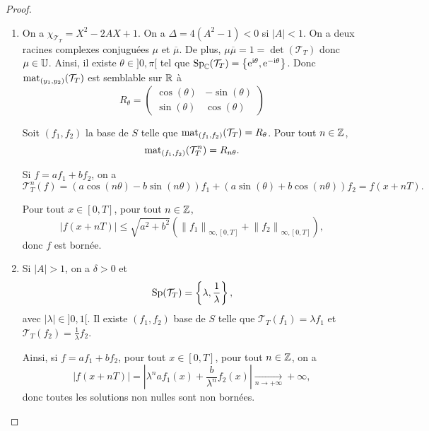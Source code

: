 \documentclass[12pt]{article}
\begin{document}
\begin{proof}
\begin{enumerate}
		\item On a $\chi_{\mathcal{T}_T}=X^{2}-2AX+1$. On a $\Delta=4(A^{2}-1)<0$ si $\left\lvert A\right\rvert<1$. On a deux racines complexes conjuguées $\mu$ et $\overline{\mu}$. De plus, $\mu\overline{\mu}=1=\det(\mathcal{T}_T)$ donc $\mu\in\mathbb{U}$. Ainsi, il existe $\theta\in]0,\pi[$ tel que $\operatorname{Sp}_{\mathbb{C}}(\mathcal{T}_T)=\left\lbrace\mathrm{e}^{\mathrm{i}\theta},\mathrm{e}^{-\mathrm{i}\theta}\right\rbrace$. Donc $\operatorname{mat}_{(y_1,y_2)}(\mathcal{T}_T)$ est semblable sur $\mathbb{R}$ à
		\begin{equation}
			R_{\theta}=\begin{pmatrix}
				\cos(\theta) & -\sin(\theta)\\
				\sin(\theta) & \cos(\theta)
			\end{pmatrix}
		\end{equation}

		Soit $(f_1,f_2)$ la base de $S$ telle que $\operatorname{mat}_{(f_1,f_2)}(\mathcal{T}_{T})=R_{\theta}$. Pour tout $n\in\mathbb{Z}$, 
		\begin{equation}
			\operatorname{mat}_{(f_1,f_2)}(\mathcal{T}_{T}^{n})=R_{n\theta}.
		\end{equation}

		Si $f=af_1+bf_2$, on a 
		\begin{equation}
			\mathcal{T}_T^{n}(f)=(a\cos(n\theta)-b\sin(n\theta))f_1+(a\sin(\theta)+b\cos(n\theta))f_2=f(x+nT).
		\end{equation}

		Pour tout $x\in[0,T]$, pour tout $n\in\mathbb{Z}$,
		\begin{equation}
			\left\lvert f(x+nT)\right\rvert\leqslant
			\sqrt{a^{2}+b^{2}}
			\left(\left\lVert f_{1}\right\rVert_{\infty,[0,T]}+\left\lVert f_2\right\rVert_{\infty,[0,T]}\right),
		\end{equation}
		donc $f$ est bornée.

		\item Si $\left\lvert A\right\rvert>1$, on a $\delta>0$ et 
		\begin{equation}
			\operatorname{Sp}(\mathcal{T}_T)=\left\lbrace\lambda,\frac{1}{\lambda}\right\rbrace,
		\end{equation}
		avec $\left\lvert\lambda\right\rvert\in]0,1[$. Il existe $(f_1,f_2)$ base de $S$ telle que $\mathcal{T}_{T}(f_1)=\lambda f_1$ et $\mathcal{T}_{T}(f_2)=\frac{1}{\lambda}f_2$. 

		Ainsi, si $f=af_1+bf_2$, pour tout $x\in[0,T]$, pour tout $n\in\mathbb{Z}$, on a 
		\begin{equation}
			\left\lvert f(x+nT)\right\rvert=\left\lvert \lambda^{n}af_1(x)+\frac{b}{\lambda^{n}}f_2(x)\right\rvert\xrightarrow[n\to+\infty]{}+\infty,
		\end{equation}
		donc toutes les solutions non nulles sont non bornées.


\end{enumerate}
\end{proof}
\end{document}
